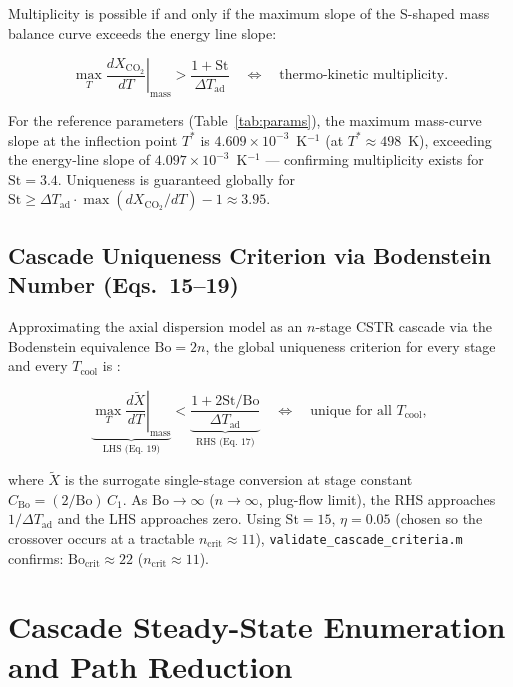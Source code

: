\documentclass[11pt,a4paper]{article}
\newcommand{\dTad}{\Delta T_{\mathrm{ad}}}
\newcommand{\Xco}{X_{\mathrm{CO_2}}}
\newcommand{\Tcool}{T_{\mathrm{cool}}}
\newcommand{\St}{\mathrm{St}}
\newcommand{\Bo}{\mathrm{Bo}}
\begin{document}
Multiplicity is possible if and only if the maximum slope of the
S-shaped mass balance curve exceeds the energy line slope:

\begin{equation}
  \max_{T}\!\left.\frac{d\Xco}{dT}\right|_{\text{mass}}
  > \frac{1+\St}{\dTad}
  \quad\Longleftrightarrow\quad \text{thermo-kinetic multiplicity}.
  \label{eq:mult_crit}
\end{equation}

For the reference parameters (Table~\ref{tab:params}), the maximum
mass-curve slope at the inflection point $T^*$ is
$4.609\times10^{-3}$~K$^{-1}$ (at $T^*\approx 498$~K), exceeding the
energy-line slope of $4.097\times10^{-3}$~K$^{-1}$ — confirming multiplicity
exists for $\St=3.4$.  Uniqueness is guaranteed globally for
$\St \geq \dTad\cdot\max(d\Xco/dT)-1 \approx 3.95$.

\subsection{Cascade Uniqueness Criterion via Bodenstein Number (Eqs.~15--19)}

Approximating the axial dispersion model as an $n$-stage CSTR cascade
via the Bodenstein equivalence $\Bo = 2n$, the global uniqueness criterion
for every stage and every $\Tcool$ is \cite{bremer2021}:

\begin{equation}
  \underbrace{\max_{T}\!\left.\frac{d\tilde{X}}{dT}\right|_{\text{mass}}}_{\text{LHS (Eq.~19)}}
  < \underbrace{\frac{1 + 2\St/\Bo}{\dTad}}_{\text{RHS (Eq.~17)}}
  \quad\Longleftrightarrow\quad \text{unique for all }  \Tcool,
  \label{eq:bo_crit}
\end{equation}

where $\tilde{X}$ is the surrogate single-stage conversion at stage constant
$C_{\Bo} = (2/\Bo)\,C_1$.  As $\Bo \to \infty$ ($n\to\infty$, plug-flow
limit), the RHS approaches $1/\dTad$ and the LHS approaches zero.
Using $\St=15$, $\eta=0.05$ (chosen so the crossover occurs at a tractable
$n_\mathrm{crit}\approx11$), \texttt{validate\_cascade\_criteria.m} confirms:
$\Bo_\mathrm{crit} \approx 22$ ($n_\mathrm{crit} \approx 11$).

\section{Cascade Steady-State Enumeration and Path Reduction}
\label{sec:paths}
\end{document}
